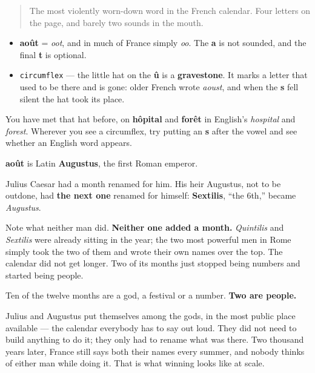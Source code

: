 \label{lesson:FR-C09-aout}



\begin{quote}
The most violently worn-down word in the French calendar. Four letters on the page, and barely two sounds in the mouth.
\end{quote}

\begin{sounds}
\begin{itemize}
\raggedright
  \item \textbf{août} = \emph{oot}, and in much of France simply \emph{oo}. The \textbf{a} is not sounded, and the final \textbf{t} is optional.
  \item \texttt{circumflex} — the little hat on the \textbf{û} is a \textbf{gravestone}. It marks a letter that used to be there and is gone: older French wrote \emph{aoust}, and when the \textbf{s} fell silent the hat took its place.
\end{itemize}

You have met that hat before, on \textbf{hôpital} and \textbf{forêt} in English's \emph{hospital} and \emph{forest}. Wherever you see a circumflex, try putting an \textbf{s} after the vowel and see whether an English word appears.
\end{sounds}

\begin{cousinweb}
\textbf{août} is Latin \textbf{Augustus}, the first Roman emperor.

Julius Caesar had a month renamed for him. His heir Augustus, not to be outdone, had \textbf{the next one} renamed for himself: \textbf{Sextilis}, \textquotedblleft{}the 6th,\textquotedblright{} became \emph{Augustus}.

Note what neither man did. \textbf{Neither one added a month.} \emph{Quintilis} and \emph{Sextilis} were already sitting in the year; the two most powerful men in Rome simply took the two of them and wrote their own names over the top. The calendar did not get longer. Two of its months just stopped being numbers and started being people.
\end{cousinweb}

\begin{culture}
Ten of the twelve months are a god, a festival or a number. \textbf{Two are people.}

Julius and Augustus put themselves among the gods, in the most public place available — the calendar everybody has to say out loud. They did not need to build anything to do it; they only had to rename what was there. Two thousand years later, France still says both their names every summer, and nobody thinks of either man while doing it. That is what winning looks like at scale.
\end{culture}

